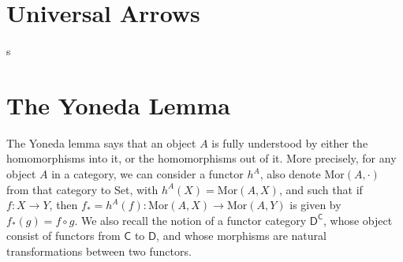 \section{Universal Arrows}

s

\section{The Yoneda Lemma}

The Yoneda lemma says that an object $A$ is fully understood by either the homomorphisms into it, or the homomorphisms out of it. More precisely, for any object $A$ in a category, we can consider a functor $h^A$, also denote $\text{Mor}(A,\cdot)$ from that category to {\sf Set}, with $h^A(X) = \text{Mor}(A,X)$, and such that if $f: X \to Y$, then $f_* = h^A(f): \text{Mor}(A,X) \to \text{Mor}(A,Y)$ is given by $f_*(g) = f \circ g$. We also recall the notion of a functor category $\mathsf{D}^{\mathsf{C}}$, whose object consist of functors from $\mathsf{C}$ to $\mathsf{D}$, and whose morphisms are natural transformations between two functors.

